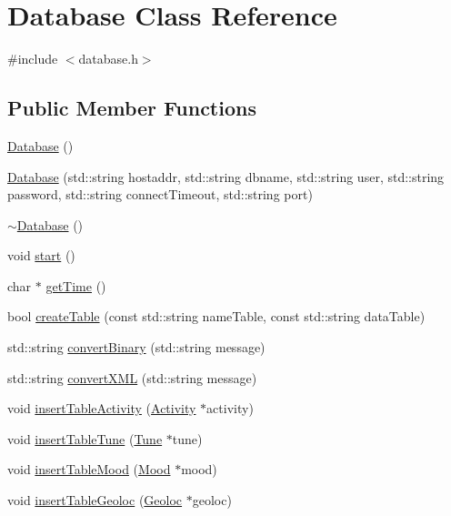 \hypertarget{classDatabase}{
\section{Database Class Reference}
\label{classDatabase}
}


{\ttfamily \#include $<$database.h$>$}

\subsection*{Public Member Functions}
\begin{DoxyCompactItemize}
\item 
\hyperlink{classDatabase_a4703c80e6969d33565ea340f768fdadf}{Database} ()
\item 
\hyperlink{classDatabase_a174f34007549b594df14306f1520238e}{Database} (std::string hostaddr, std::string dbname, std::string user, std::string password, std::string connectTimeout, std::string port)
\item 
\hyperlink{classDatabase_a84d399a2ad58d69daab9b05330e1316d}{$\sim$Database} ()
\item 
void \hyperlink{classDatabase_a65c7d2cc56b627d6bb9ab4be25dad2dc}{start} ()
\item 
char $\ast$ \hyperlink{classDatabase_a0be1ba1393e19becbeffed6b15fcfe91}{getTime} ()
\item 
bool \hyperlink{classDatabase_a4b48b0e706c1017b6ef0a4015b53080b}{createTable} (const std::string nameTable, const std::string dataTable)
\item 
std::string \hyperlink{classDatabase_a3199eea5fdae26872668a43f345841fd}{convertBinary} (std::string message)
\item 
std::string \hyperlink{classDatabase_a491ca397cd5339ddc2474e64e1b66b00}{convertXML} (std::string message)
\item 
void \hyperlink{classDatabase_ab313dba2c4a1ba81b6e81f0342e76f1f}{insertTableActivity} (\hyperlink{classActivity}{Activity} $\ast$activity)
\item 
void \hyperlink{classDatabase_a23060c24f9d5fcfb85d302e30882b62d}{insertTableTune} (\hyperlink{classTune}{Tune} $\ast$tune)
\item 
void \hyperlink{classDatabase_a77052db1584364171f640ac6e17532bf}{insertTableMood} (\hyperlink{classMood}{Mood} $\ast$mood)
\item 
void \hyperlink{classDatabase_ac5e578fc33954b0cb1e52c2d95d3ca0b}{insertTableGeoloc} (\hyperlink{classGeoloc}{Geoloc} $\ast$geoloc)

\end{DoxyCompactItemize}
